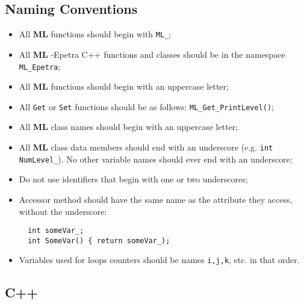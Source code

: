 \documentclass[10pt,letter,relax]{SANDreport}
\newcommand{\ML}     {{\bf ML }}
\begin{document}
\subsection{Naming Conventions}

\begin{itemize}
\item All \ML functions should begin with \verb!ML_!;
\item All \ML-Epetra C++ functions and classes should be in the namespace {\tt
  ML\_Epetra};
\item All \ML functions should begin with an uppercase letter;
\item All \verb!Get! or \verb!Set! functions should be as follows:
\verb!ML_Get_PrintLevel()!;
\item All \ML class names should begin with an uppercase letter;
\item All \ML class data members should end with an underscore (e.g. \verb!int NumLevel_!).
No other variable names should ever end with an underscore;
\item Do not use identifiers that begin with one or two underscores;
\item Accessor method should have the same name as the attribute they access,
  without the underscore:
  \begin{verbatim}
  int someVar_;
  int SomeVar() { return someVar_);
  \end{verbatim}
\item Variables used for loops counters should be names \verb!i,j,k!, etc.
  in that order. 
\end{itemize}

\subsection{C++}
\end{document}
